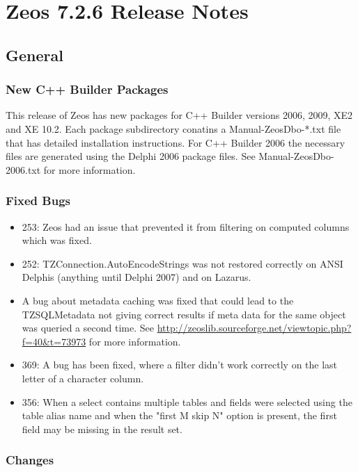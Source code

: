 \documentclass[a4paper,12pt,oneside]{book}
\begin{document}
\chapter{Zeos 7.2.6 Release Notes}

\section{General}
\label{sec:Rev6_General}

\subsection{New C++ Builder Packages}
\label{sec:Rev6_General_CppBuilderPackages}
This release of Zeos has new packages for C++ Builder versions 2006, 2009, XE2 and XE 10.2.
Each package subdirectory conatins a Manual-ZeosDbo-*.txt file that has detailed installation instructions.
For C++ Builder 2006 the necessary files are generated using the Delphi 2006 package files.
See Manual-ZeosDbo-2006.txt for more information.

\subsection{Fixed Bugs}
\label{sec:Rev6_General_FixedBugs}

\begin{itemize}
\item 253: Zeos had an issue that prevented it from filtering on computed columns which was fixed.
\item 252: TZConnection.AutoEncodeStrings was not restored correctly on ANSI Delphis (anything until Delphi 2007) and on Lazarus.
\item 	
  A bug about metadata caching was fixed that could lead to the TZSQLMetadata not giving correct results if meta data for the same object was queried a second time.
	See \url{http://zeoslib.sourceforge.net/viewtopic.php?f=40&t=73973} for more information.
\item
  369:
	A bug has been fixed, where a filter didn't work correctly on the last letter of a character column.
\item
  356:
	When a select contains multiple tables and fields were selected using the table alias name and when the "first M skip N" option is present, the first field may be missing in the result set. 
\end{itemize}

\subsection{Changes}
\label{sec:Rev6_General_Changes}
\end{document}
